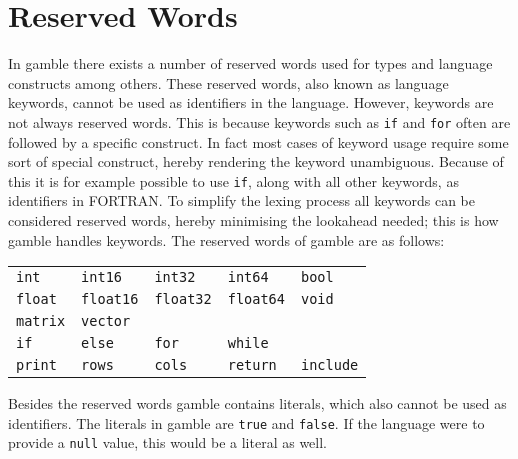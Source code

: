 \section{Reserved Words}

\label{sec:reserved_words}
In \gls{gamble} there exists a number of reserved words used for types and language constructs among others.
These reserved words, also known as language keywords, cannot be used as identifiers in the language. However, keywords are not always reserved words.
This is because keywords such as \texttt{if} and \texttt{for} often are followed by a specific construct.
In fact most cases of keyword usage require some sort of special construct, hereby rendering the keyword unambiguous.
Because of this it is for example possible to use \texttt{if}, along with all other keywords, as identifiers in FORTRAN.\citep{fortran_identifiers}
To simplify the lexing process all keywords can be considered reserved words, hereby minimising the lookahead needed; this is how \gls{gamble} handles keywords.
The reserved words of \gls{gamble} are as follows:
\begin{table}[h!]
	\centering
	\def\arraystretch{1.5} \setlength{\tabcolsep}{2em}
	\begin{tabular}{l l l l l}
        \texttt{int}     & \texttt{int16}     & \texttt{int32}     & \texttt{int64}     & \texttt{bool}    \\
        \texttt{float}   & \texttt{float16}   & \texttt{float32}   & \texttt{float64}   & \texttt{void}    \\
        \texttt{matrix}  & \texttt{vector}    &                    &                    &                  \\
        \texttt{if}      & \texttt{else}      & \texttt{for}       & \texttt{while}     &                  \\
        \texttt{print}   & \texttt{rows}      & \texttt{cols}      & \texttt{return}    & \texttt{include} \\
    \end{tabular}
	\def\arraystretch{1}
\end{table}

Besides the reserved words \gls{gamble} contains literals, which also cannot be used as identifiers.
The literals in \gls{gamble} are \texttt{true} and \texttt{false}.
If the language were to provide a \texttt{null} value, this would be a literal as well.

